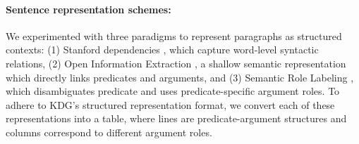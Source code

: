 \paragraph{Sentence representation schemes:}
We experimented with three paradigms to represent paragraphs as structured contexts:
(1) Stanford dependencies \cite{Marneffe2008TheST}, which capture word-level syntactic relations,
(2) Open Information Extraction \citep[Open IE]{Banko2007OpenIE}, a
shallow semantic representation which directly links predicates
and arguments, 
and
(3) Semantic Role Labeling \citep[SRL]{SRL}, which disambiguates predicate and uses predicate-specific
argument roles. 
To adhere to KDG's structured representation format,
we convert each of these representations into a table, where lines are predicate-argument structures and columns correspond to different argument roles.



